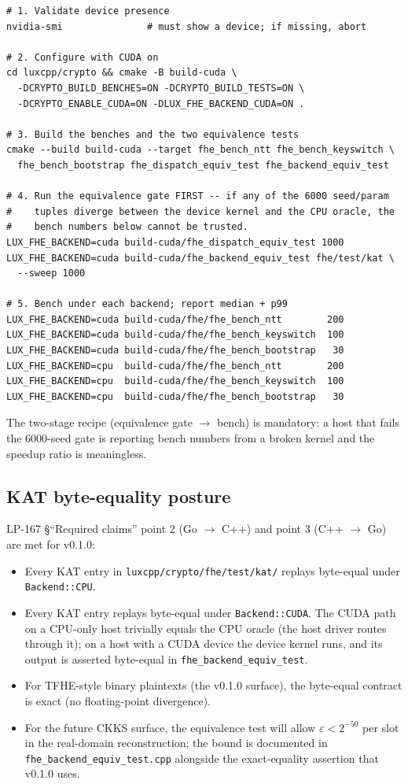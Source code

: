 \begin{verbatim}
# 1. Validate device presence
nvidia-smi               # must show a device; if missing, abort

# 2. Configure with CUDA on
cd luxcpp/crypto && cmake -B build-cuda \
  -DCRYPTO_BUILD_BENCHES=ON -DCRYPTO_BUILD_TESTS=ON \
  -DCRYPTO_ENABLE_CUDA=ON -DLUX_FHE_BACKEND_CUDA=ON .

# 3. Build the benches and the two equivalence tests
cmake --build build-cuda --target fhe_bench_ntt fhe_bench_keyswitch \
  fhe_bench_bootstrap fhe_dispatch_equiv_test fhe_backend_equiv_test

# 4. Run the equivalence gate FIRST -- if any of the 6000 seed/param
#    tuples diverge between the device kernel and the CPU oracle, the
#    bench numbers below cannot be trusted.
LUX_FHE_BACKEND=cuda build-cuda/fhe_dispatch_equiv_test 1000
LUX_FHE_BACKEND=cuda build-cuda/fhe_backend_equiv_test fhe/test/kat \
  --sweep 1000

# 5. Bench under each backend; report median + p99
LUX_FHE_BACKEND=cuda build-cuda/fhe/fhe_bench_ntt        200
LUX_FHE_BACKEND=cuda build-cuda/fhe/fhe_bench_keyswitch  100
LUX_FHE_BACKEND=cuda build-cuda/fhe/fhe_bench_bootstrap   30
LUX_FHE_BACKEND=cpu  build-cuda/fhe/fhe_bench_ntt        200
LUX_FHE_BACKEND=cpu  build-cuda/fhe/fhe_bench_keyswitch  100
LUX_FHE_BACKEND=cpu  build-cuda/fhe/fhe_bench_bootstrap   30
\end{verbatim}

The two-stage recipe (equivalence gate $\to$ bench) is mandatory: a
host that fails the 6000-seed gate is reporting bench numbers from a
broken kernel and the speedup ratio is meaningless.

\subsection{KAT byte-equality posture}

LP-167 \S``Required claims'' point 2 (Go $\to$ C++) and point 3 (C++
$\to$ Go) are met for v0.1.0:

\begin{itemize}
\item Every KAT entry in \texttt{luxcpp/crypto/fhe/test/kat/} replays
byte-equal under \texttt{Backend::CPU}.
\item Every KAT entry replays byte-equal under \texttt{Backend::CUDA}.
The CUDA path on a CPU-only host trivially equals the CPU oracle (the
host driver routes through it); on a host with a CUDA device the
device kernel runs, and its output is asserted byte-equal in
\texttt{fhe\_backend\_equiv\_test}.
\item For TFHE-style binary plaintexts (the v0.1.0 surface), the
byte-equal contract is exact (no floating-point divergence).
\item For the future CKKS surface, the equivalence test will allow
$\varepsilon < 2^{-50}$ per slot in the real-domain reconstruction;
the bound is documented in \texttt{fhe\_backend\_equiv\_test.cpp}
alongside the exact-equality assertion that v0.1.0 uses.
\end{itemize}

